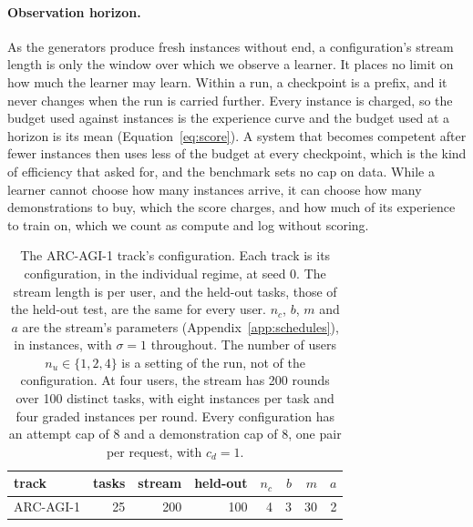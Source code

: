 \paragraph{Observation horizon.} As the generators produce fresh instances without end, a configuration's stream length is only the window over which we observe a learner. It places no limit on how much the learner may learn. Within a run, a checkpoint is a prefix, and it never changes when the run is carried further. Every instance is charged, so the budget used against instances is the experience curve and the budget used at a horizon is its mean (Equation~\ref{eq:score}). A system that becomes competent after fewer instances then uses less of the budget at every checkpoint, which is the kind of efficiency that \citet{chollet2019measure} asked for, and the benchmark sets no cap on data. While a learner cannot choose how many instances arrive, it can choose how many demonstrations to buy, which the score charges, and how much of its experience to train on, which we count as compute and log without scoring.

\begin{table}[t]
\centering
\small
\setlength{\tabcolsep}{4pt}
\begin{tabular}{lrrrrrrr}
\toprule
track & tasks & stream & held-out & $n_c$ & $b$ & $m$ & $a$ \\
\midrule
ARC-AGI-1 & 25  & 200       & 100 & 4  & 3      & 30      & 2   \\
\bottomrule
\end{tabular}
\caption{The ARC-AGI-1 track's configuration. Each track is its configuration, in the individual regime, at seed 0. The stream length is per user, and the held-out tasks, those of the held-out test, are the same for every user. $n_c$, $b$, $m$ and $a$ are the stream's parameters (Appendix~\ref{app:schedules}), in instances, with $\sigma = 1$ throughout. The number of users $n_u \in \{1, 2, 4\}$ is a setting of the run, not of the configuration. At four users, the stream has 200 rounds over 100 distinct tasks, with eight instances per task and four graded instances per round. Every configuration has an attempt cap of 8 and a demonstration cap of 8, one pair per request, with $c_d = 1$.}
\label{tab:configs}
\end{table}

